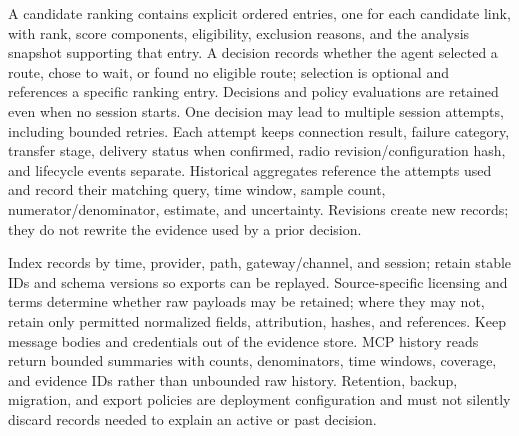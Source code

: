 \documentclass[11pt,a4paper]{article}
\begin{document}
A candidate ranking contains explicit ordered entries, one for each candidate
link, with rank, score components, eligibility, exclusion reasons, and the
analysis snapshot supporting that entry. A decision records whether the agent
selected a route, chose to wait, or found no eligible route; selection is
optional and references a specific ranking entry. Decisions and policy
evaluations are retained even when no session starts. One decision may lead
to multiple session attempts, including bounded retries. Each attempt keeps
connection result, failure category, transfer stage, delivery status when
confirmed, radio revision/configuration hash, and lifecycle events separate.
Historical aggregates reference the attempts used and record their matching
query, time window, sample count, numerator/denominator, estimate, and
uncertainty. Revisions create new records; they do not rewrite the evidence
used by a prior decision.

Index records by time, provider, path, gateway/channel, and session; retain
stable IDs and schema versions so exports can be replayed. Source-specific
licensing and terms determine whether raw payloads may be retained; where they
may not, retain only permitted normalized fields, attribution, hashes, and
references. Keep message bodies and credentials out of the evidence store.
MCP history reads return bounded summaries with counts, denominators, time
windows, coverage, and evidence IDs rather than unbounded raw history.
Retention, backup, migration, and export policies are deployment
configuration and must not silently discard records needed to explain an
active or past decision.
\end{document}
